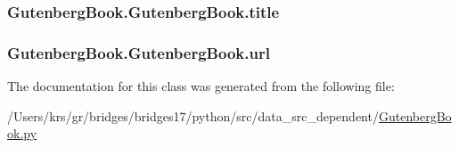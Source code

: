 \subsubsection[{title}]{\setlength{\rightskip}{0pt plus 5cm}Gutenberg\+Book.\+Gutenberg\+Book.\+title}\label{class_gutenberg_book_1_1_gutenberg_book_adbf667fb4a34b8937c3c4e755f62b3dd}
\hypertarget{class_gutenberg_book_1_1_gutenberg_book_a1b1ef102b505b472d010795193a1594c}{}
\subsubsection[{url}]{\setlength{\rightskip}{0pt plus 5cm}Gutenberg\+Book.\+Gutenberg\+Book.\+url}\label{class_gutenberg_book_1_1_gutenberg_book_a1b1ef102b505b472d010795193a1594c}


The documentation for this class was generated from the following file\+:\begin{DoxyCompactItemize}
\item 
/\+Users/krs/gr/bridges/bridges17/python/src/data\+\_\+src\+\_\+dependent/\hyperlink{_gutenberg_book_8py}{Gutenberg\+Book.\+py}\end{DoxyCompactItemize}
